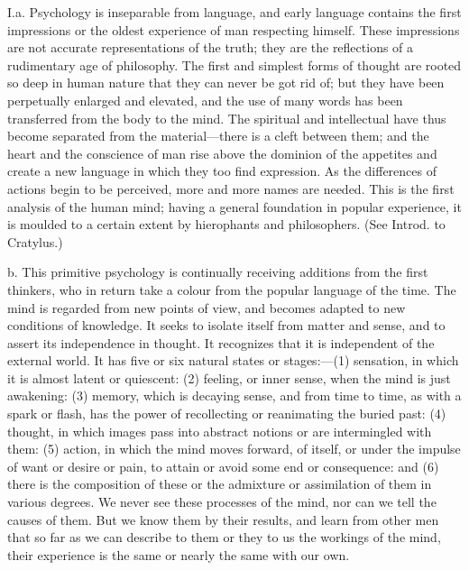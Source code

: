 \documentclass[11pt,letter]{article}
\begin{document}
\par  I.a. Psychology is inseparable from language, and early language contains the first impressions or the oldest experience of man respecting himself. These impressions are not accurate representations of the truth; they are the reflections of a rudimentary age of philosophy. The first and simplest forms of thought are rooted so deep in human nature that they can never be got rid of; but they have been perpetually enlarged and elevated, and the use of many words has been transferred from the body to the mind. The spiritual and intellectual have thus become separated from the material—there is a cleft between them; and the heart and the conscience of man rise above the dominion of the appetites and create a new language in which they too find expression. As the differences of actions begin to be perceived, more and more names are needed. This is the first analysis of the human mind; having a general foundation in popular experience, it is moulded to a certain extent by hierophants and philosophers. (See Introd. to Cratylus.)

\par  b. This primitive psychology is continually receiving additions from the first thinkers, who in return take a colour from the popular language of the time. The mind is regarded from new points of view, and becomes adapted to new conditions of knowledge. It seeks to isolate itself from matter and sense, and to assert its independence in thought. It recognizes that it is independent of the external world. It has five or six natural states or stages:—(1) sensation, in which it is almost latent or quiescent: (2) feeling, or inner sense, when the mind is just awakening: (3) memory, which is decaying sense, and from time to time, as with a spark or flash, has the power of recollecting or reanimating the buried past: (4) thought, in which images pass into abstract notions or are intermingled with them: (5) action, in which the mind moves forward, of itself, or under the impulse of want or desire or pain, to attain or avoid some end or consequence: and (6) there is the composition of these or the admixture or assimilation of them in various degrees. We never see these processes of the mind, nor can we tell the causes of them. But we know them by their results, and learn from other men that so far as we can describe to them or they to us the workings of the mind, their experience is the same or nearly the same with our own.
\end{document}
